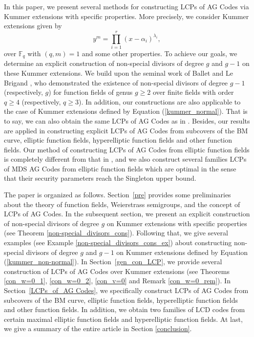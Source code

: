 \documentclass[journal,12pt,onecolumn]{IEEEtran}
\begin{document}
In this paper, we present several methods for constructing LCPs of AG Codes via Kummer extensions with specific properties. More precisely, we consider Kummer extensions given by
\begin{equation}\label{kummer_non-normal}
    y^m = \prod_{i=1}^r(x - \alpha_i)^{\lambda_i},
\end{equation}
over $\mathbb{F}_q$ with $(q,m) = 1$ and some other properties. To achieve our goals, we determine an explicit construction of non-special divisors of degree $g$ and $g-1$ on these Kummer extensions. We build upon the seminal work of Ballet and Le Brigand \cite{BALLET2006293}, who demonstrated the existence of non-special divisors of degree $g-1$ (respectively,  $ g $) for function fields of genus $g\ge2$ over finite fields with order $q\ge4$ (respectively, $q\ge3$). In addition, our constructions are also applicable to the case of Kummer extensions defined by Equation (\ref{kummer_normal}). That is to say, we can also obtain the same LCPs of AG Codes as in \cite{Linear_Complementary_Dual_codes_and_Linear_Complementary_Pairs_of_AG_codes_in_function_fields}. Besides, our results are applied in constructing explicit LCPs of AG Codes from subcovers of the BM curve, elliptic function fields, hyperelliptic function fields and other function fields. Our method of constructing LCPs of AG Codes from elliptic function fields is completely different from that in \cite{Linear_Complementary_Dual_codes_and_Linear_Complementary_Pairs_of_AG_codes_in_function_fields}, and we also construct several families LCPs of MDS AG Codes from elliptic function fields which are optimal in the sense that their security parameters reach the Singleton upper bound. 

The paper is organized as follows. Section~\ref{pre} provides some preliminaries about the theory of function fields, Weierstrass semigroups, and the concept of LCPs of AG Codes. In the subsequent section, we present an explicit construction of non-special divisors of degree $g$ on Kummer extensions with specific properties (see Theorem \ref{non-special_divisors_cons}). Following that, we give several examples (see Example \ref{non-special_divisors_cons_ex}) about constructing non-special divisors of degree $g$ and $g-1$ on Kummer extensions defined by Equation (\ref{kummer_non-normal}). In Section~\ref{gen_con_LCP}, we provide several construction of LCPs of AG Codes over Kummer extensions (see Theorems \ref{con_w=0_1}, \ref{con_w=0_2}, \ref{con_v=0} and Remark \ref{con_w=0_rem}). In Section~\ref{LCPs_of_AG Codes}, we specifically construct LCPs of AG Codes from subcovers of the BM curve, elliptic function fields, hyperelliptic function fields and other function fields. In addition, we obtain two families of LCD codes from certain maximal elliptic function fields and hyperelliptic function fields. At last, we give a summary of the entire article in Section \ref{conclusion}. 
\end{document}
